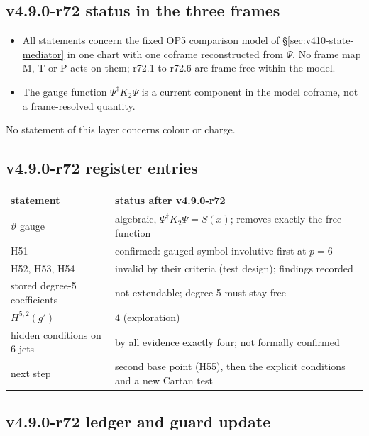 \subsection*{v4.9.0-r72 status in the three frames}
\label{subsec:v490-r72-frames}

\begin{itemize}[leftmargin=2em]
\item All statements concern the fixed OP5 comparison model of \S\ref{sec:v410-state-mediator} in one chart with one coframe
reconstructed from \(\Psi\).  No frame map M, T or P acts on them; r72.1 to r72.6 are frame-free within the model.
\item The gauge function \(\Psi^\dagger K_2\Psi\) is a current component in the model coframe, not a frame-resolved quantity.
\end{itemize}
No statement of this layer concerns colour or charge.

\subsection*{v4.9.0-r72 register entries}
\label{subsec:v490-r72-register}

\begin{center}
\small
\begin{tabular}{@{}>{\raggedright\arraybackslash}p{}>{\raggedright\arraybackslash}p{}@{}}
\toprule
statement & status after v4.9.0-r72\\
\midrule
\(\vartheta\) gauge & algebraic, \(\Psi^\dagger K_2\Psi=S(x)\); removes exactly the free function\\
H51 & confirmed: gauged symbol involutive first at \(p=6\)\\
H52, H53, H54 & invalid by their criteria (test design); findings recorded\\
stored degree-5 coefficients & not extendable; degree 5 must stay free\\
\(H^{5,2}(g')\) & \(4\) (exploration)\\
hidden conditions on 6-jets & by all evidence exactly four; not formally confirmed\\
next step & second base point (H55), then the explicit conditions and a new Cartan test\\
\bottomrule
\end{tabular}
\end{center}

\subsection*{v4.9.0-r72 ledger and guard update}
\label{subsec:v490-r72-ledger-guard}

